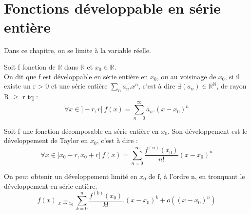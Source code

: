 \section{Fonctions développable en série entière}
Dans ce chapitre, on se limite à la variable réelle.
\begin{de}
Soit f fonction de $\mathbb{R}$ dans $\mathbb{R}$ et $x_0 \in \mathbb{R}$.\\
On dit que f est développable en série entière en $x_0$, ou au voisinage de $x_0$, si il existe un r > 0 et une série entière $\underset{n} \sum a_n.x^n$, c'est à dire $\exists (a_n) \in \mathbb{R}^{\mathbb{N}}$, de rayon R $\geq$ r tq :
$$\forall x \in ]-r,r[~ f(x) = \sum_{n=0}^{\infty} a_n.(x-x_0)^n$$
\end{de}
\begin{prop}
Soit f une fonction décomposable en série entière en $x_0$. Son développement est le développement de Taylor en $x_0$, c'est à dire : 
$$\forall x \in ]x_0-r,x_0+r[~ f(x) = \sum_{n=0}^{\infty} \dfrac{f^{(n)}(x_0)}{n!}(x-x_0)^n$$
\end{prop}
\begin{corr}
On peut obtenir un développement limité en $x_0$ de f, à l'ordre n, en tronquant le développement en série entière.
$$f(x) \underset{x \rightarrow x_0}= \sum_{k=0}^n \dfrac{f^{(k)}(x_0)}{k!}.(x-x_0)^k + o((x-x_0)^n)$$
\end{corr}
